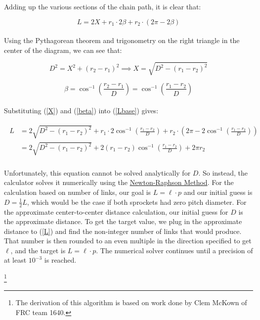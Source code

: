 \documentclass[a4paper]{article}
\newcommand\blfootnote[1]{%
	\begingroup
	\renewcommand\thefootnote{}\footnote{#1}%
	\addtocounter{footnote}{-1}%
	\endgroup
}
\begin{document}
	Adding up the various sections of the chain path, it is clear that:
	
	\begin{equation} \label{Lbase}
		L = 2X + r_1 \cdot 2\beta + r_2 \cdot \left( 2\pi - 2\beta \right)
	\end{equation}
	\\
	Using the Pythagorean theorem and trigonometry on the right triangle in the center of the diagram, we can see that:
	
	\begin{equation} \label{X}
		D^2 = X^2 + \left( r_2 - r_1 \right)^2 \implies X = \sqrt{D^2 - \left( r_1 - r_2 \right)^2}
	\end{equation}
	
	\begin{equation} \label{beta}
		\beta = \cos^{-1} \left( \frac{r_2 - r_1}{D} \right) = \cos^{-1} \left( \frac{r_1 - r_2}{D} \right)
	\end{equation}
	\\
	Substituting (\ref{X}) and (\ref{beta}) into (\ref{Lbase}) gives:
	
	\begin{gather} \label{L}
	\begin{aligned}
		L &= 2 \sqrt{D^2 - (r_1 - r_2)^2} + r_1 \cdot 2 \cos^{-1} \left( \frac{r_1 - r_2}{D} \right) + r_2 \cdot \left( 2\pi - 2\cos^{-1} \left( \frac{r_1 - r_2}{D} \right) \right) \\
		&= 2 \sqrt{D^2 - \left( r_1 - r_2 \right)^2} + 2 \left( r_1 - r_2 \right) \cos^{-1} \left( \frac{r_1 - r_2}{D} \right) + 2\pi r_2
	\end{aligned}
	\end{gather}
	\\
	Unfortunately, this equation cannot be solved analytically for $ D $. So instead, the calculator solves it numerically using the \href{https://en.wikipedia.org/wiki/Newton\%27s_method}{Newton-Raphson Method}. For the calculation based on number of links, our goal is $ L = \ell \cdot p $ and our initial guess is $ D = \frac{1}{2} L $, which would be the case if both sprockets had zero pitch diameter. For the approximate center-to-center distance calculation, our initial guess for $ D $ is the approximate distance. To get the target value, we plug in the approximate distance to (\ref{L}) and find the non-integer number of links that would produce. That number is then rounded to an even multiple in the direction specified to get $ \ell $, and the target is $ L = \ell \cdot p $. The numerical solver continues until a precision of at least $ 10^{-3} $ is reached.
	
	\blfootnote{The derivation of this algorithm is based on work done by Clem McKown of FRC team 1640.}
	
	
\end{document}
